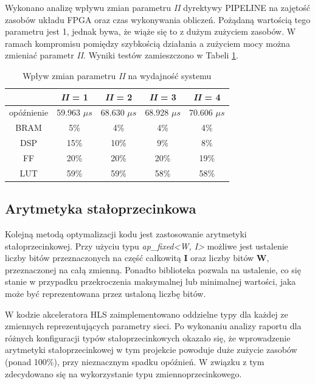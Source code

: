Wykonano analizę wpływu zmian parametru \emph{II} dyrektywy PIPELINE na zajętość zasobów układu FPGA oraz czas wykonywania obliczeń. Pożądaną wartością tego parametru jest 1, jednak bywa, że wiąże się to z dużym zużyciem zasobów. W ramach kompromisu pomiędzy szybkością działania a zużyciem mocy można zmieniać parametr \emph{II}. Wyniki testów zamieszczono w Tabeli \ref{tab:ii-relu}.

\begin{table}[h] \centering
  \caption{Wpływ zmian parametru \emph{II} na wydajność systemu}
  \centering
  \begin{tabular} {c|c|c|c|c} \hline \label{tab:ii-relu}  

                  & \emph{II} = 1   & \emph{II} = 2   & \emph{II} = 3   & \emph{II} = 4   \\\hline
    opóźnienie    & 59.963  $\mu s$ & 68.630 $\mu s$  & 68.928 $\mu s$  & 70.606 $\mu s$  \\
    BRAM          & 5\%             & 4\%             & 4\%             & 4\%             \\
    DSP           & 15\%            & 10\%            & 9\%             & 8\%             \\
    FF            & 20\%            & 20\%            & 20\%            & 19\%            \\
    LUT           & 59\%            & 59\%            & 58\%            & 58\%            \\
  \end{tabular}
\end{table}


\subsection{Arytmetyka stałoprzecinkowa}

Kolejną metodą optymalizacji kodu jest zastosowanie arytmetyki stałoprzecinkowej. Przy użyciu typu \emph{ap\_fixed<W, I>} możliwe jest ustalenie liczby bitów przeznaczonych na część całkowitą \textbf{I} oraz liczby bitów \textbf{W}, przeznaczonej na całą zmienną. Ponadto biblioteka pozwala na ustalenie, co się stanie w przypadku przekroczenia maksymalnej lub minimalnej wartości, jaka może być reprezentowana przez ustaloną liczbę bitów.

W kodzie akceleratora HLS zaimplementowano oddzielne typy dla każdej ze zmiennych reprezentujących parametry sieci. Po wykonaniu analizy raportu dla różnych konfiguracji typów stałoprzecinkowych okazało się, że wprowadzenie arytmetyki stałoprzecinkowej w tym projekcie powoduje duże zużycie zasobów (ponad 100\%), przy nieznacznym spadku opóźnień. W związku z tym zdecydowano się na wykorzystanie typu zmiennoprzecinkowego.

